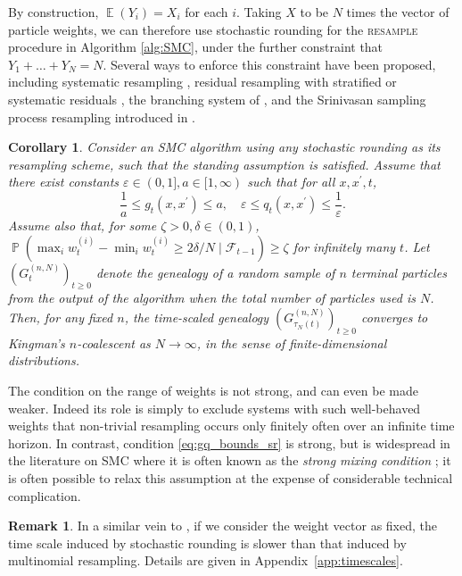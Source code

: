 \documentclass{article}
\newtheorem{corollary}{Corollary}
\theoremstyle{definition}
\newtheorem{remark}{Remark}
\DeclareMathOperator{\Prob}{\mathbb{P}}
\DeclareMathOperator{\E}{\mathbb{E}}
\newcommand{\1}[1]{\mathbbm{1}_{\{#1\}}}
\begin{document}
By construction, $\E(Y_i) = X_i$ for each $i$. Taking $X$ to be $N$ times the vector of particle weights, we can therefore use stochastic rounding for the \textsc{resample} procedure in Algorithm \ref{alg:SMC}, under the further constraint that $Y_1 + \dots + Y_N = N$. Several ways to enforce this constraint have been proposed, including systematic resampling \citep{carpenter1999, whitley1994}, residual resampling with stratified or systematic residuals \citep{whitley1994}, the branching system of \citet{crisan1997}, and the Srinivasan sampling process resampling introduced in \citet{gerber2017}.

\begin{corollary}\label{thm:stochrounding}
Consider an SMC algorithm using any stochastic rounding as its resampling scheme, such that the standing assumption is satisfied.
Assume that there exist constants $\varepsilon\in (0,1], a\in [1,\infty)$ such that for all $x, x^\prime, t$,
\begin{equation}\label{eq:gq_bounds_sr}
\frac{1}{a} \leq g_t(x, x^\prime) \leq a , \quad
\varepsilon \leq q_t(x, x^\prime) \leq \frac{1}{\varepsilon} .
\end{equation}
Assume also that, for some $\zeta>0, \delta \in (0,1)$, $\Prob( \max_i w_t^{(i)} - \min_i w_t^{(i)} \geq 2\delta/N \mid \mathcal{F}_{t-1} ) \geq \zeta$ for infinitely many $t$.
Let $(G_t^{(n,N)})_{t\geq0}$ denote the genealogy of a random sample of $n$ terminal particles from the output of the algorithm when the total number of particles used is $N$. Then, for any fixed $n$, the time-scaled genealogy $(G_{\tau_N(t)}^{(n,N)})_{t\geq0}$ converges to Kingman's $n$-coalescent as $N\to \infty$, in the sense of finite-dimensional distributions.
\end{corollary}
The condition on the range of weights is not strong, and can even be made weaker. Indeed its role is simply to exclude systems with such well-behaved weights that non-trivial resampling occurs only finitely often over an infinite time horizon. In contrast, condition \eqref{eq:gq_bounds_sr} is strong, but is widespread in the literature on SMC where it is often known as the \emph{strong mixing condition} \citep[Section 3.5.2]{delmoral2004}; it is often possible to relax this assumption at the expense of considerable technical complication.

\begin{remark}
In a similar vein to \citet[Remark 3]{koskela2018}, if we consider the weight vector as fixed, the time scale induced by stochastic rounding is slower than that induced by multinomial resampling. Details are given in Appendix~\ref{app:timescales}.
\end{remark}
\end{document}
